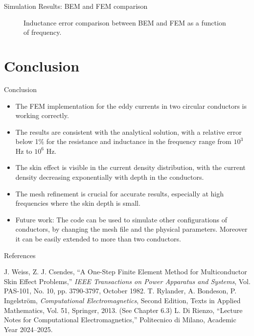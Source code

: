 \documentclass[aspectratio=54,xcolor=dvipsnames]{beamer}
\begin{document}
\begin{frame}{Simulation Results: BEM and FEM comparison}
\begin{center}
\begin{minipage}{0.49\textwidth}
\begin{figure}[H]
            \caption{Inductance error comparison between BEM and FEM as a function of frequency.}
        \end{figure}
    \end{minipage}
    \end{center}
\end{frame}

\section{Conclusion}
\begin{frame}{Conclusion}
    \small
    \begin{itemize}
        \item The FEM implementation for the eddy currents in two circular conductors is working correctly.
        \item The results are consistent with the analytical solution, with a relative error below 1\% for the resistance and inductance in the frequency range from $10^3$ Hz to $10^6$ Hz.
        \item The skin effect is visible in the current density distribution, with the current density decreasing exponentially with depth in the conductors.
        \item The mesh refinement is crucial for accurate results, especially at high frequencies where the skin depth is small.
        \item Future work: The code can be used to simulate other configurations of conductors, by changing the mesh file and the physical parameters. Moreover it can be easily extended to more than two conductors.
    \end{itemize}
\end{frame}

\begin{frame}{References}
    \footnotesize
    \begin{thebibliography}{99}
         J. Weiss, Z. J. Csendes, ``A One-Step Finite Element Method for Multiconductor Skin Effect Problems,'' \emph{IEEE Transactions on Power Apparatus and Systems}, Vol. PAS-101, No. 10, pp. 3790-3797, October 1982.
        T. Rylander, A. Bondeson, P. Ingelström, \emph{Computational Electromagnetics}, Second Edition, Texts in Applied Mathematics, Vol. 51, Springer, 2013. (See Chapter 6.3)
        L. Di Rienzo, ``Lecture Notes for Computational Electromagnetics,'' Politecnico di Milano, Academic Year 2024--2025.
    \end{thebibliography}
\end{frame}
\end{document}
